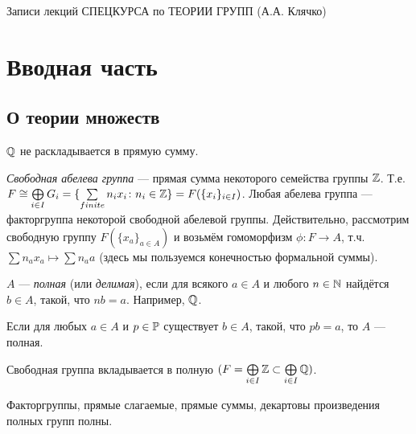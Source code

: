\documentclass[10pt,a4paper]{article}%
\begin{document}
\begin{center}{\sf Записи лекций СПЕЦКУРСА по ТЕОРИИ ГРУПП (А.А.
Клячко)}
\end{center}

\section{Вводная часть}
\subsection{О теории множеств}

\begin{exercise}$\mathbb Q$ не раскладывается в прямую
сумму.
\end{exercise}

\emph{Свободная абелева группа}
--- прямая сумма некоторого семейства группы $\mathbb Z$. Т.е. $F\cong
\bigoplus\limits_{i\in I}G_i=\{\sum\limits_{finite}n_i x_i\colon
n_i\in\mathbb Z\}=F(\{x_i\}_{i\in I})$. Любая абелева группа
--- факторгруппа некоторой свободной абелевой группы.
Действительно, рассмотрим свободную группу $F(\{x_a\}_{a\in A})$ и
возьмём гомоморфизм $\phi\colon F\rightarrow A$, т.ч. $\sum n_a
x_a\mapsto\sum n_a a$ (здесь мы пользуемся конечностью формальной
суммы).

$A$ ---  \emph{полная} (или
\emph{делимая}), если для всякого $a\in A$ и
любого $n\in\mathbb N$ найдётся $b\in A$, такой, что $nb=a$. Например,
$\mathbb Q$.

\begin{fact} Если для любых $a\in A$ и
$p\in \mathbb P$ существует $b\in A$, такой, что $pb=a$, то $A$ ---
полная.
\end{fact}

\begin{fact} Свободная группа вкладывается в полную
$(F=\bigoplus\limits_{i\in I}\mathbb Z\subset\bigoplus\limits_{i\in
I}\mathbb Q)$.
\end{fact}

\begin{fact} Факторгруппы, прямые слагаемые, прямые суммы,
декартовы произведения полных групп полны.
\end{fact}
\end{document}

